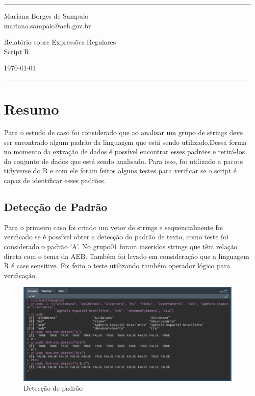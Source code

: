 \documentclass[a4paper]{article}
\begin{document}

\fancyhead[C]{}
\hrule \medskip %
\begin{minipage}{0.295\textwidth} 
\raggedright
\footnotesize
Mariana Borges de Sampaio \hfill\\   
mariana.sampaio@aeb.gov.br
\end{minipage}
\begin{minipage}{0.4\textwidth} 
\centering 
\large 
Relatório sobre Expressões Regulares\\ 
\normalsize 
Script R\\ 
\end{minipage}
\begin{minipage}{0.295\textwidth} 
\raggedleft
\today\hfill\\
\end{minipage}
\medskip\hrule 
\bigskip


\section{Resumo}
Para o estudo de caso foi considerado que ao analisar um grupo de strings deve ser encontrado algum padrão da linguagem que está sendo utilizado.Dessa forma no momento da extração de dados é possível encontrar esses padrões e retirá-los do conjunto de dados que está sendo analisado. Para isso, foi utilizado a pacote tidyverse do R e com ele foram feitos alguns testes para verificar se o script é capaz de identificar esses padrões.

\subsection{Detecção de Padrão}
Para o primeiro caso foi criado um vetor de strings e sequencialmente foi verificado se é possível obter a detecção do padrão de texto, como teste foi considerado o padrão 'A'. No grupo01 foram inseridos strings que têm relação direta com o tema da AEB. Também foi levado em consideração que a linguagem R é case sensitive. Foi feito o teste utilizando também operador lógico para verificação. 
\begin{figure}[htb!]
    \centering
    \includegraphics[width=0.7\linewidth]{style/image/caso01.png}
    \caption{Detecção de padrão}
    \label{fig:Detecção}
\end{figure}
\end{document}
